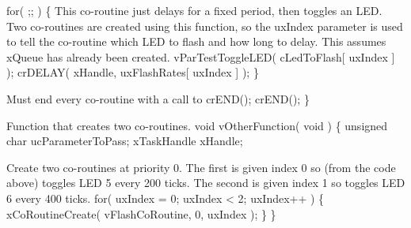 \begin{DoxyPre}     for( ;; )
     \{
This co-routine just delays for a fixed period, then toggles
an LED.  Two co-routines are created using this function, so
the uxIndex parameter is used to tell the co-routine which
LED to flash and how long to delay.  This assumes xQueue has
already been created.
         vParTestToggleLED( cLedToFlash[ uxIndex ] );
         crDELAY( xHandle, uxFlashRates[ uxIndex ] );
     \}\end{DoxyPre}



\begin{DoxyPre}Must end every co-routine with a call to crEND();
     crEND();
 \}\end{DoxyPre}



\begin{DoxyPre}Function that creates two co-routines.
 void vOtherFunction( void )
 \{
 unsigned char ucParameterToPass;
 xTaskHandle xHandle;\end{DoxyPre}



\begin{DoxyPre}Create two co-routines at priority 0.  The first is given index 0
so (from the code above) toggles LED 5 every 200 ticks.  The second
is given index 1 so toggles LED 6 every 400 ticks.
     for( uxIndex = 0; uxIndex < 2; uxIndex++ )
     \{
         xCoRoutineCreate( vFlashCoRoutine, 0, uxIndex );
     \}
 \}
   \end{DoxyPre}
 
